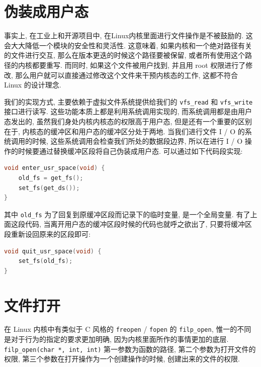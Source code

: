 \documentclass[11pt,fleqn]{book} %
\begin{document}
\section{伪装成用户态}



事实上, 在工业上和开源项目中, 在Linux内核里面进行文件操作是不被鼓励的. 这会大大降低一个模块的安全性和灵活性. 这意味着,
如果内核和一个绝对路径有关的文件进行交互, 那么在版本更迭的时候这个路径要被保留, 或者所有使用这个路径的内核都要重写. 而同时,
如果这个文件被用户找到, 并且用 root 权限进行了修改, 那么用户就可以直接通过修改这个文件来干预内核态的工作, 这都不符合 Linux
的设计理念.  

我们的实现方式, 主要依赖于虚拟文件系统提供给我们的 \texttt{vfs\_read} 和 \texttt{vfs\_write}
接口进行读写. 这些功能本质上都是利用系统调用实现的, 而系统调用都是由用户态发出的, 虽然我们身处内核内核态的权限高于用户态, 但是还有一个重要的区别在于,
内核态的缓冲区和用户态的缓冲区分处于两地. 当我们进行文件 I / O 的系统调用的时候, 这些系统调用会检查我们所处的数据段边界,
所以在进行 I / O 操作的时候要通过替换缓冲区段将自己伪装成用户态. 可以通过如下代码段实现:

\vspace*{0.5cm}

\begin{lstlisting}[language=C]
void enter_usr_space(void) {
	old_fs = get_fs();
	set_fs(get_ds());
}
\end{lstlisting}


\vspace*{0.5cm}

其中 \texttt{old\_fs} 为了回复到原缓冲区段而记录下的临时变量, 是一个全局变量. 有了上面这段代码, 当离开用户态的缓冲区段时候的代码也就呼之欲出了,
只要将缓冲区段重新设回原来的区段即可:

\vspace*{0.5cm}

\begin{lstlisting}[language=C]
void quit_usr_space(void) {
	set_fs(old_fs);
}
\end{lstlisting}


\vspace*{0.5cm}


\section{文件打开}



在 Linux 内核中有类似于 C 风格的 \texttt{freopen} / \texttt{fopen} 的 \texttt{filp\_open},
惟一的不同是对于行为的指定的要求更加明确, 因为内核里面所作的事情更加的底层. \texttt{filp\_open(char {*},
int, int)} 第一参数为函数的路径, 第二个参数为打开文件的权限, 第三个参数在打开操作为一个创建操作的时候, 创建出来的文件的权限. 
\end{document}
